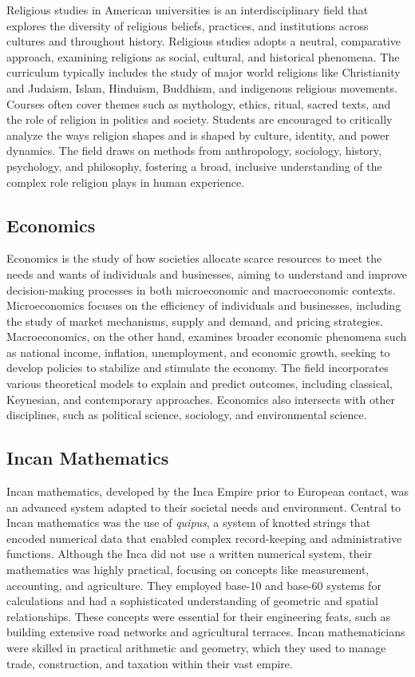 \documentclass[12pt]{article}
\begin{document}
Religious studies in American universities is an interdisciplinary field that explores the diversity of religious beliefs, practices, and institutions across cultures and throughout history. Religious studies adopts a neutral, comparative approach, examining religions as social, cultural, and historical phenomena. The curriculum typically includes the study of major world religions like Christianity and Judaism, Islam, Hinduism, Buddhism, and indigenous religious movements. Courses often cover themes such as mythology, ethics, ritual, sacred texts, and the role of religion in politics and society. Students are encouraged to critically analyze the ways religion shapes and is shaped by culture, identity, and power dynamics. The field draws on methods from anthropology, sociology, history, psychology, and philosophy, fostering a broad, inclusive understanding of the complex role religion plays in human experience.

\subsection{Economics}

Economics is the study of how societies allocate scarce resources to meet the needs and wants of individuals and businesses, aiming to understand and improve decision-making processes in both microeconomic and macroeconomic contexts. Microeconomics focuses on the efficiency of individuals and businesses, including the study of market mechanisms, supply and demand, and pricing strategies. Macroeconomics, on the other hand, examines broader economic phenomena such as national income, inflation, unemployment, and economic growth, seeking to develop policies to stabilize and stimulate the economy. The field incorporates various theoretical models to explain and predict outcomes, including classical, Keynesian, and contemporary approaches. Economics also intersects with other disciplines, such as political science, sociology, and environmental science.

\subsection{Incan Mathematics}

Incan mathematics, developed by the Inca Empire prior to European contact, was an advanced system adapted to their societal needs and environment. Central to Incan mathematics was the use of \textit{quipus}, a system of knotted strings that encoded numerical data that enabled complex record-keeping and administrative functions. Although the Inca did not use a written numerical system, their mathematics was highly practical, focusing on concepts like measurement, accounting, and agriculture. They employed base-10 and base-60 systems for calculations and had a sophisticated understanding of geometric and spatial relationships.  These concepts were essential for their engineering feats, such as building extensive road networks and agricultural terraces. Incan mathematicians were skilled in practical arithmetic and geometry, which they used to manage trade, construction, and taxation within their vast empire.
\end{document}
